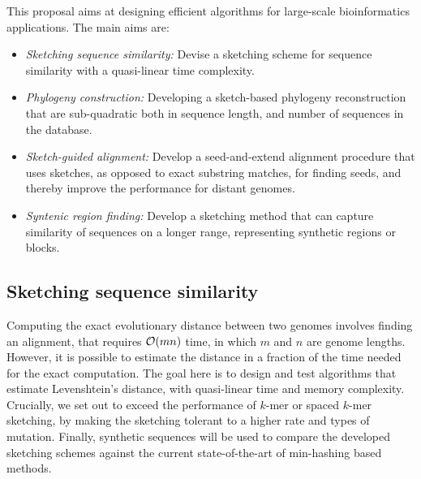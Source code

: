 
This proposal aims at designing efficient algorithms for large-scale bioinformatics applications. The main aims are:
\begin{itemize}
    \item  \textit{Sketching sequence similarity:} Devise a sketching scheme for sequence similarity with a quasi-linear time complexity. 
    \item \textit{Phylogeny construction:} Developing a sketch-based phylogeny reconstruction that are sub-quadratic both in sequence length, and number of sequences in the database. 
    \item \textit{Sketch-guided alignment:} Develop a seed-and-extend alignment procedure that uses sketches, as opposed to exact substring matches, for finding seeds, and thereby improve the performance for distant genomes. 
    \item \textit{Syntenic region finding:} Develop a sketching method that can capture similarity of sequences on a longer range, representing synthetic regions or blocks. 
\end{itemize}


\subsection{Sketching sequence similarity}
Computing the exact evolutionary distance between two genomes involves finding an alignment, that requires $\mathcal{O}(mn)$ time, in which $m$ and $n$ are genome lengths. However, it is possible to estimate the distance in a fraction of the time needed for the exact computation. The goal here is to design and test algorithms that estimate Levenshtein's distance, with quasi-linear time and memory complexity. Crucially, we set out to exceed the performance of $k$-mer or spaced $k$-mer sketching, by making the sketching tolerant to a higher rate and types of mutation.  Finally, synthetic sequences will be used to compare the developed sketching schemes against the current state-of-the-art of min-hashing based methods. 


